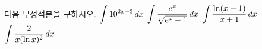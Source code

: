 다음 부정적분을 구하시오.
 $\displaystyle\int 10^{2x+3}\mkern3mu dx$
 $\displaystyle\int\dfrac{e^x}{\sqrt{e^x-1}}\mkern3mu dx$
 $\displaystyle\int\dfrac{\ln(x+1)}{x+1}\mkern3mu dx$
 $\displaystyle\int\dfrac{2}{x(\ln x)^2}\mkern3mu dx$
